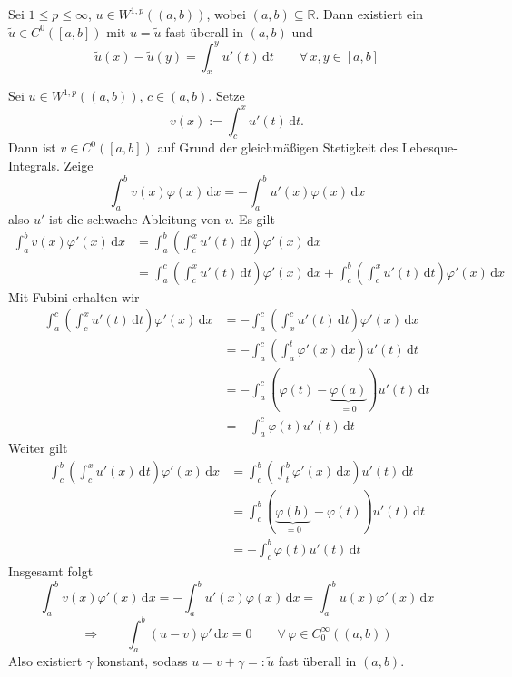 \begin{satz}
	Sei $1 \leq p \leq \infty$, $u \in W^{1,p}((a,b))$, wobei $(a,b) \subseteq \mathbb{R}$. Dann existiert ein $\tilde u \in C^0([a,b])$ mit $u = \tilde u$ fast überall in $(a,b)$ und 
	\[
		\tilde u(x) - \tilde u(y) = \int_{x}^{y}u'(t) \,\mathrm{d}t \qquad \forall\, x,y \in [a,b]
	\]
\end{satz}
\begin{beweis}
	Sei $u \in W^{1,p}((a,b))$, $c \in (a,b)$. Setze
	\[
		v(x):= \int_{c}^{x}u'(t) \,\mathrm{d}t.
	\]
	Dann ist $v \in C^0([a,b])$ auf Grund der gleichmäßigen Stetigkeit des Lebesque-Integrals. Zeige
	\[
		\int_{a}^{b} v(x) \varphi(x) \,\mathrm{d}x = - \int_{a}^{b}u'(x) \varphi(x) \,\mathrm{d}x
	\]
	also $u'$ ist die schwache Ableitung von $v$. Es gilt
	\begin{align*}
		\int_{a}^{b}v(x) \varphi'(x) \,\mathrm{d}x &= \int_{a}^{b} \left( \int_{c}^{x} u'(t) \,\mathrm{d}t \right) \varphi'(x) \,\mathrm{d}x \\
		&= \int_{a}^{c} \left( \int_{c}^{x} u'(t) \,\mathrm{d}t \right) \varphi'(x) \,\mathrm{d}x + \int_{c}^{b} \left( \int_{c}^{x} u'(t) \,\mathrm{d}t \right) \varphi'(x) \,\mathrm{d}x
	\end{align*}
	Mit Fubini erhalten wir
	\begin{align*}
		\int_{a}^{c} \left( \int_{c}^{x}u'(t) \,\mathrm{d}t \right) \varphi'(x) \,\mathrm{d}x &= - \int_{a}^{c}\left( \int_{x}^{c}u'(t) \,\mathrm{d}t \right) \varphi'(x) \,\mathrm{d}x \\ 
		&= - \int_{a}^{c} \left( \int_{a}^{t} \varphi'(x) \,\mathrm{d}x \right)u'(t) \,\mathrm{d}t \\
		&= - \int_{a}^{c} \left( \varphi(t) - \underset{=0}{\underbrace{\varphi(a)}} \right) u'(t) \,\mathrm{d}t \\
		&= - \int_{a}^{c} \varphi(t) u'(t) \,\mathrm{d}t
	\end{align*}
	Weiter gilt
	\begin{align*}
		\int_{c}^{b} \left( \int_{c}^{x} u'(x) \,\mathrm{d}t \right) \varphi'(x) \,\mathrm{d}x &= \int_{c}^{b} \left( \int_{t}^{b} \varphi'(x) \,\mathrm{d}x \right) 
		u'(t)\,\mathrm{d}t \\
		&= \int_{c}^{b} \left( \underset{=0}{\underbrace{\varphi(b)}} - \varphi(t) \right) u'(t) \,\mathrm{d}t \\
		&= - \int_{c}^{b} \varphi(t) u'(t) \,\mathrm{d}t
	\end{align*}
	Insgesamt folgt
	\[
		\int_{a}^{b} v(x) \varphi'(x) \,\mathrm{d}x = - \int_{a}^{b} u'(x)\varphi(x) \,\mathrm{d}x = \int_{a}^{b} u(x) \varphi'(x) \,\mathrm{d}x
	\]
	\[
		\Rightarrow \qquad \int_{a}^{b}(u-v) \varphi' \,\mathrm{d}x = 0 \qquad \forall\, \varphi \in C^{\infty}_0((a,b))
	\]
	Also existiert $\gamma$ konstant, sodass $u = v+ \gamma =: \tilde u$ fast überall in $(a,b)$.
\end{beweis}
